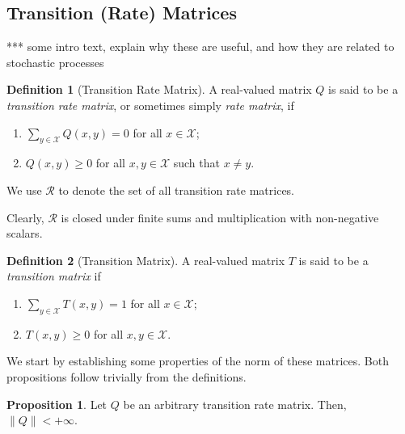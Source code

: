 \documentclass[10pt]{paper}
\theoremstyle{definition}
\newtheorem{proposition}[theorem]{Proposition}
\newtheorem{definition}{Definition}
\newcommand{\states}{\mathcal{X}}
\newcommand{\norm}[1]{\left\lVert #1 \right\rVert}
\begin{document}
\subsection{Transition (Rate) Matrices}\label{sec:trans_rate_matrices}

*** some intro text, explain why these are useful, and how they are related to stochastic processes

\begin{definition}[Transition Rate Matrix]\label{def:rate_matrix}
A real-valued matrix $Q$ is said to be a \emph{transition rate matrix}, or sometimes simply \emph{rate matrix}, if

\vspace{5pt}
\begin{enumerate}[label=R\arabic*:]
\item
$\sum_{y\in\states}Q(x,y)=0$ for all $x\in\states$;
\item
$Q(x,y)\geq0$ for all $x,y\in\states$ such that $x\neq y$.
\end{enumerate}
\vspace{5pt}
\noindent
We use $\mathcal{R}$ to denote the set of all transition rate matrices. 
\end{definition}

\noindent Clearly, $\mathcal{R}$ is closed under finite sums and multiplication with non-negative scalars. 

\begin{definition}[Transition Matrix]\label{def:stoch_matrix}
A real-valued matrix $T$ is said to be a \emph{transition matrix} if
\vspace{5pt}
\begin{enumerate}[label=S\arabic*:,ref=N\arabic*]
\item
$\sum_{y\in\states}T(x,y)=1$ for all $x\in\states$;\label{def:trans_matrix_is_stochastic}
\item
$T(x,y)\geq0$ for all $x,y\in\states$.
\end{enumerate}
\vspace{5pt}
\noindent
\end{definition}

\noindent We start by establishing some properties of the norm of these matrices. Both propositions follow trivially from the definitions.

\begin{proposition}
Let $Q$ be an arbitrary transition rate matrix. Then, $\norm{Q}<+\infty$.
\end{proposition}
\end{document}
